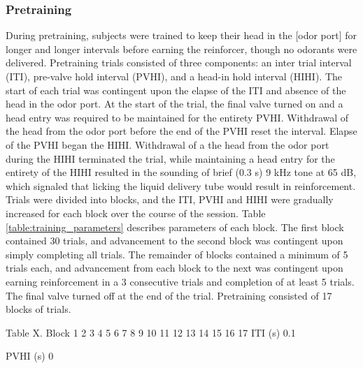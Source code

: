 \subsubsection{Pretraining}
During pretraining, subjects were trained to keep their head in the [odor port] for longer and longer intervals before earning the reinforcer, though no odorants were delivered. Pretraining trials consisted of three components: an inter trial interval (ITI), pre-valve hold interval (PVHI), and a head-in hold interval (HIHI). The start of each trial was contingent upon the elapse of the ITI and absence of the head in the odor port. At the start of the trial, the final valve turned on and a head entry was required to be maintained for the entirety PVHI. Withdrawal of the head from the odor port before the end of the PVHI reset the interval. Elapse of the PVHI began the HIHI. Withdrawal of a the head from the odor port during the HIHI terminated the trial, while maintaining a head entry for the entirety of the HIHI resulted in the sounding of brief (0.3 s) 9 kHz tone at 65 dB, which signaled that licking the liquid delivery tube would result in reinforcement.
Trials were divided into blocks, and the ITI, PVHI and HIHI were gradually increased for each block over the course of the session. Table \ref{table:training_parameters} describes parameters of each block. The first block contained 30 trials, and advancement to the second block was contingent upon simply completing all trials. The remainder of blocks contained a minimum of 5 trials each, and advancement from each block to the next was contingent upon earning reinforcement in a 3 consecutive trials and completion of at least 5 trials. The final valve turned off at the end of the trial. Pretraining consisted of 17 blocks of trials.

Table X.
Block
1
2
3
4
5
6
7
8
9
10
11
12
13
14
15
16
17
ITI (s)
0.1
 
 
 
 
 
 
 
 
 
 
 
 
 
 
 
 
PVHI (s)
0
 
 
 
 
 
 
 
 
 
 
 
 
 
 
 
